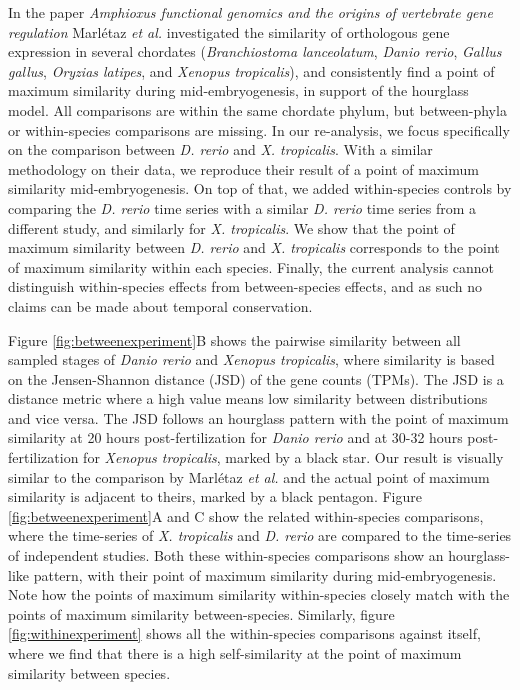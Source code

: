 In the paper \textit{Amphioxus functional genomics and the origins of vertebrate gene regulation}\cite{marletaz2018} Marl\'etaz \textit{et al.} investigated the similarity of orthologous gene expression in several chordates (\textit{Branchiostoma lanceolatum}, \textit{Danio rerio}, \textit{Gallus gallus}, \textit{Oryzias latipes}, and \textit{Xenopus tropicalis}), and consistently find a point of maximum similarity during mid-embryogenesis, in support of the hourglass model. All comparisons are within the same chordate phylum, but between-phyla or within-species comparisons are missing. In our re-analysis, we focus specifically on the comparison between \textit{D. rerio} and \textit{X. tropicalis}. With a similar methodology on their data, we reproduce their result of a point of maximum similarity mid-embryogenesis. On top of that, we added within-species controls by comparing the \textit{D. rerio} time series with a similar \textit{D. rerio} time series from a different study, and similarly for \textit{X. tropicalis}. We show that the point of maximum similarity between \textit{D. rerio} and \textit{X. tropicalis} corresponds to the point of maximum similarity within each species. Finally, the current analysis cannot distinguish within-species effects from between-species effects, and as such no claims can be made about temporal conservation.

Figure \ref{fig:betweenexperiment}B shows the pairwise similarity between all sampled stages of \textit{Danio rerio} and \textit{Xenopus tropicalis}, where similarity is based on the Jensen-Shannon distance (JSD) of the gene counts (TPMs). The JSD is a distance metric where a high value means low similarity between distributions and vice versa. The JSD follows an hourglass pattern with the point of maximum similarity at 20 hours post-fertilization for \textit{Danio rerio} and at 30-32 hours post-fertilization for \textit{Xenopus tropicalis}, marked by a black star. Our result is visually similar to the comparison by Marl\'etaz \textit{et al.} and the actual point of maximum similarity is adjacent to theirs, marked by a black pentagon. Figure \ref{fig:betweenexperiment}A and C show the related within-species comparisons, where the time-series of \textit{X. tropicalis} and \textit{D. rerio} are compared to the time-series of independent studies\cite{Hu2017,White2017}. Both these within-species comparisons show an hourglass-like pattern, with their point of maximum similarity during mid-embryogenesis. Note how the points of maximum similarity within-species closely match with the points of maximum similarity between-species. Similarly, figure \ref{fig:withinexperiment} shows all the within-species comparisons against itself, where we find that there is a high self-similarity at the point of maximum similarity between species. 

